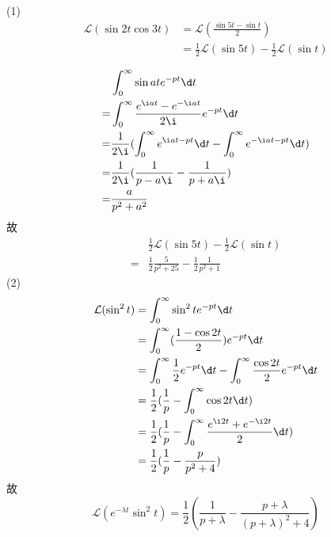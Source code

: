 \documentclass{phyasgn}
\renewcommand{\L}{\mathcal{L}}
\begin{document}
\begin{sol}[4]
    (1)\begin{align*}
        \L(\sin2t\cos3t)&=\L(\frac{\sin5t-\sin t}{2})\\
        &=\frac{1}{2}\L(\sin5t)-\frac{1}{2}\L(\sin t)\\
    \end{align*}
    \begin{align*}
        &\int_{0}^{\infty}\sin ate^{-pt}\d t\\
        =&\int_{0}^{\infty}\frac{e^{\i at}-e^{-\i at}}{2\i}e^{-pt}\d t\\
        =&\frac{1}{2\i}(\int_{0}^{\infty}e^{\i at-pt}\d t-\int_{0}^{\infty}e^{-\i at-pt}\d t) \\
        =&\frac{1}{2\i}(\frac{1}{p-a\i}-\frac{1}{p+a\i})\\
        =&\frac{a}{p^2+a^2}
    \end{align*}
    故
    \begin{align*}
        &\frac{1}{2}\L(\sin5t)-\frac{1}{2}\L(\sin t)\\
        =&\frac{1}{2}\frac{5}{p^2+25}-\frac{1}{2}\frac{1}{p^2+1}
    \end{align*}
    (2)\begin{align*}
        \L(\sin^2 t)&=\int_{0}^{\infty}\sin^2te^{-pt}\d t\\
        &=\int_{0}^{\infty}(\frac{1-\cos2t}{2})e^{-pt}\d t\\
        &=\int_{0}^{\infty}\frac{1}{2}e^{-pt}\d t-\int_{0}^{\infty}\frac{\cos2t}{2}e^{-pt}\d t\\
        &=\frac{1}{2}(\frac{1}{p}-\int_{0}^{\infty}\cos 2t\d t)\\
        &=\frac{1}{2}(\frac{1}{p}-\int_{0}^{\infty}\frac{e^{\i 2t}+e^{-\i 2t}}{2}\d t)\\
        &=\frac{1}{2}(\frac{1}{p}-\frac{p}{p^2+4})
    \end{align*}
    故$$\L(e^{-\lambda t}\sin^2 t)=\frac{1}{2}(\frac{1}{p+\lambda}-\frac{p+\lambda}{(p+\lambda)^2+4})$$
\end{sol}\par
\end{document}
